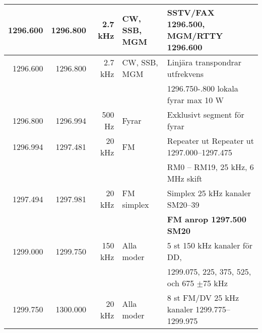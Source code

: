 \documentclass[10pt,swedish,a4paper,twoside]{article}
\begin{document}
\begin{landscape}
\begin{tabular}{rrrll}
		         1296.600 & 1296.800 &     2.7 kHz & CW, SSB, MGM    & SSTV/FAX 1296.500, MGM/RTTY 1296.600                           \\ \hline
		         1296.600 & 1296.800 &     2.7 kHz & CW, SSB, MGM    & Linjära transpondrar utfrekvens                                \\
		                  &          &             &                 & 1296.750-.800 lokala fyrar max 10 W                            \\ \hline
		         1296.800 & 1296.994 &      500 Hz & Fyrar           & Exklusivt segment för fyrar                                    \\ \hline
		         1296.994 & 1297.481 &      20 kHz & FM              & Repeater ut Repeater ut 1297.000--1297.475                     \\
		                  &          &             &                 & RM0 – RM19, 25 kHz, 6 MHz skift                                \\ \hline
		         1297.494 & 1297.981 &      20 kHz & FM simplex      & Simplex 25 kHz kanaler SM20--39                                \\
		                  &          &             &                 & \textbf{FM anrop 1297.500 SM20}                                \\ \hline
		         1299.000 & 1299.750 &     150 kHz & Alla moder      & 5 st 150 kHz kanaler för DD,                                   \\
		                  &          &             &                 & 1299.075, 225, 375, 525, och 675 $\pm$75 kHz                   \\ \hline
		         1299.750 & 1300.000 &      20 kHz & Alla moder      & 8 st FM/DV 25 kHz kanaler 1299.775--1299.975
	\end{tabular}
\end{landscape}
\end{document}
